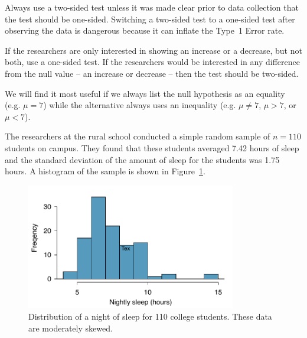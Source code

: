 Always use a two-sided test unless it was made clear prior to data collection that the test should be one-sided. Switching a two-sided test to a one-sided test after observing the data is dangerous because it can inflate the Type~1 Error rate. 

\begin{tipBox}{
If the researchers are only interested in showing an increase or a decrease, but not both, use a one-sided test. If the researchers would be interested in any difference from the null value -- an increase or decrease -- then the test should be two-sided.\vspace{0.5mm}}
\end{tipBox}

\begin{tipBox}{
We will find it most useful if we always list the null hypothesis as an equality (e.g. $\mu = 7$) while the alternative always uses an inequality (e.g. $\mu\neq7$, $\mu>7$, or $\mu<7$).}
\end{tipBox}

The researchers at the rural school conducted a simple random sample of $n=110$ students on campus. They found that these students averaged 7.42 hours of sleep and the standard deviation of the amount of sleep for the students was 1.75 hours. A histogram of the sample is shown in Figure~\ref{histOfSleepForCollegeThatWasCheckingForMoreThan7Hours}.

\begin{figure}
\centering
\includegraphics[height=55mm]{ch_inference_foundations/figures/histOfSleepForCollegeThatWasCheckingForMoreThan7Hours/histOfSleepForCollegeThatWasCheckingForMoreThan7Hours}
\caption{Distribution of a night of sleep for 110 college students. These data are moderately skewed.}
\label{histOfSleepForCollegeThatWasCheckingForMoreThan7Hours}
\end{figure}

